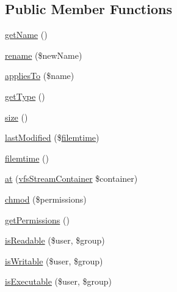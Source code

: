 \subsection*{Public Member Functions}
\begin{DoxyCompactItemize}
\item 
\mbox{\hyperlink{interfaceorg_1_1bovigo_1_1vfs_1_1vfs_stream_content_a3d0963e68bb313b163a73f2803c64600}{get\+Name}} ()
\item 
\mbox{\hyperlink{interfaceorg_1_1bovigo_1_1vfs_1_1vfs_stream_content_ab40397a8b5cf98ff82734ce7b1276363}{rename}} (\$new\+Name)
\item 
\mbox{\hyperlink{interfaceorg_1_1bovigo_1_1vfs_1_1vfs_stream_content_a1769b12aee6e9730bcf9b56703eb6a03}{applies\+To}} (\$name)
\item 
\mbox{\hyperlink{interfaceorg_1_1bovigo_1_1vfs_1_1vfs_stream_content_a830b5c75df72b32396701bc563fbe3c7}{get\+Type}} ()
\item 
\mbox{\hyperlink{interfaceorg_1_1bovigo_1_1vfs_1_1vfs_stream_content_a775bfb88c1bb7975d67f277eade2a1b7}{size}} ()
\item 
\mbox{\hyperlink{interfaceorg_1_1bovigo_1_1vfs_1_1vfs_stream_content_ae862e04a845949a0d2bf4cada6a06ac4}{last\+Modified}} (\$\mbox{\hyperlink{interfaceorg_1_1bovigo_1_1vfs_1_1vfs_stream_content_ad730553073cd7d21080fe7c2770ef457}{filemtime}})
\item 
\mbox{\hyperlink{interfaceorg_1_1bovigo_1_1vfs_1_1vfs_stream_content_ad730553073cd7d21080fe7c2770ef457}{filemtime}} ()
\item 
\mbox{\hyperlink{interfaceorg_1_1bovigo_1_1vfs_1_1vfs_stream_content_a807677a6a863886bc4aa2dbc1f473d56}{at}} (\mbox{\hyperlink{interfaceorg_1_1bovigo_1_1vfs_1_1vfs_stream_container}{vfs\+Stream\+Container}} \$container)
\item 
\mbox{\hyperlink{interfaceorg_1_1bovigo_1_1vfs_1_1vfs_stream_content_a6c64687533218867184ace2d0015b230}{chmod}} (\$permissions)
\item 
\mbox{\hyperlink{interfaceorg_1_1bovigo_1_1vfs_1_1vfs_stream_content_a98e8f81c4e0869a6adf4a36ca1a6860a}{get\+Permissions}} ()
\item 
\mbox{\hyperlink{interfaceorg_1_1bovigo_1_1vfs_1_1vfs_stream_content_a6e17ffc20ba30d5013b65b8f8c878363}{is\+Readable}} (\$user, \$group)
\item 
\mbox{\hyperlink{interfaceorg_1_1bovigo_1_1vfs_1_1vfs_stream_content_a0dfcddc1935dbacac2d92b58c86a6743}{is\+Writable}} (\$user, \$group)
\item 
\mbox{\hyperlink{interfaceorg_1_1bovigo_1_1vfs_1_1vfs_stream_content_aa05f3a5ff79b553dfe46fd51006459e0}{is\+Executable}} (\$user, \$group)

\end{DoxyCompactItemize}
